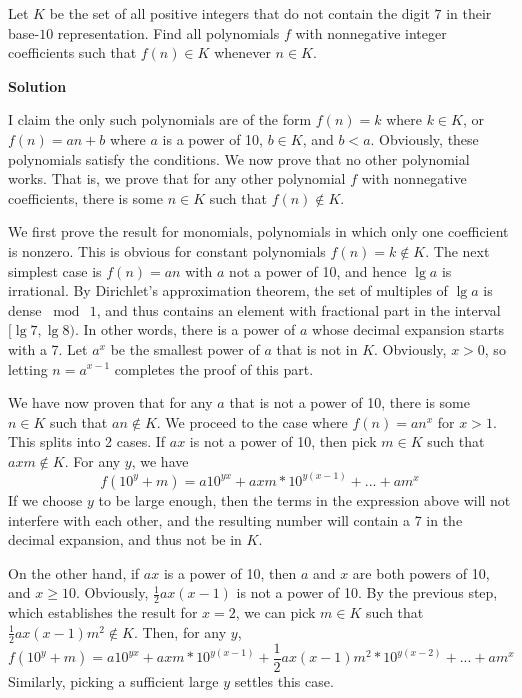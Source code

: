 \begin{enumerate}
 Let $K$ be the set of all positive integers that do not contain the digit $7$ in their base-$10$ representation. Find all polynomials $f$ with nonnegative integer coefficients such that $f(n)\in K$ whenever $n\in K$.


 



 



\textbf{Solution}

I claim the only such polynomials are of the form $f(n)=k$ where $k\in K$, or $f(n)=an+b$ where $a$ is a power of 10, $b\in K$, and $b<a$. Obviously, these polynomials satisfy the conditions. We now prove that no other polynomial works. That is, we prove that for any other polynomial $f$ with nonnegative coefficients, there is some $n\in K$ such that $f(n)\notin K$.

 We first prove the result for monomials, polynomials in which only one coefficient is nonzero. This is obvious for constant polynomials $f(n)=k\notin K$. The next simplest case is $f(n)=an$ with $a$ not a power of 10, and hence $\lg a$ is irrational. By Dirichlet's approximation theorem, the set of multiples of $\lg a$ is dense $\bmod\ 1$, and thus contains an element with fractional part in the interval $[\lg 7,\lg 8)$. In other words, there is a power of $a$ whose decimal expansion starts with a 7. Let $a^x$ be the smallest power of $a$ that is not in $K$. Obviously, $x>0$, so letting $n=a^{x-1}$ completes the proof of this part.

 
We have now proven that for any $a$ that is not a power of 10, there is some $n\in K$ such that $an\notin K$. We proceed to the case where $f(n)=an^x$ for $x>1$. This splits into 2 cases. If $ax$ is not a power of 10, then pick $m\in K$ such that $axm\notin K$. For any $y$, we have
 \[f(10^y+m)=a10^{yx}+axm*10^{y(x-1)}+...+am^x\]If we choose $y$ to be large enough, then the terms in the expression above will not interfere with each other, and the resulting number will contain a 7 in the decimal expansion, and thus not be in $K$.

 On the other hand, if $ax$ is a power of 10, then $a$ and $x$ are both powers of 10, and $x\ge10$. Obviously, $\frac12ax(x-1)$ is not a power of 10. By the previous step, which establishes the result for $x=2$, we can pick $m\in K$ such that $\frac12ax(x-1)m^2\notin K$. Then, for any $y$,
 \[f(10^y+m)=a10^{yx}+axm*10^{y(x-1)}+\frac12ax(x-1)m^2*10^{y(x-2)}+...+am^x\]Similarly, picking a sufficient large $y$ settles this case.


\end{enumerate}

